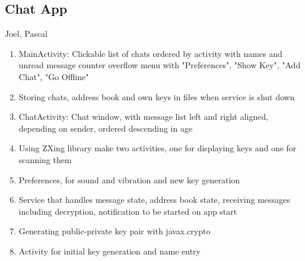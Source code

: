 		\subsection{Chat App}
			Joel, Pascal
			\begin{enumerate}
				\item MainActivity: Clickable list of chats ordered by activity with names and unread message counter overflow menu with "Preferences", "Show Key", "Add Chat", "Go Offline"
				\item Storing chats, address book and own keys in files when service is shut down
				\item ChatActivity: Chat window, with message list left and right aligned, depending on sender, ordered descending in age
				\item Using ZXing library make two activities, one for displaying keys and one for scanning them
				\item Preferences, for sound and vibration and new key generation
				\item Service that handles message state, address book state, receiving messages including decryption, notification to be started on app start
				\item Generating public-private key pair with javax.crypto
				\item Activity for initial key generation and name entry
			\end{enumerate}
			